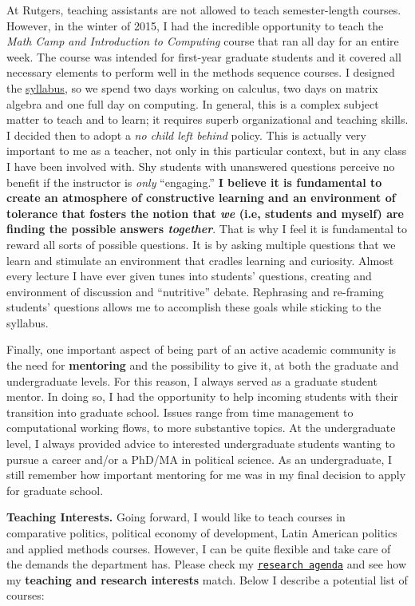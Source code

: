 \documentclass[10pt,stdletter,dateno,sigleft]{newlfm} %
\begin{document}
\begin{newlfm}
At Rutgers, teaching assistants are not allowed to teach semester-length courses. However, in the winter of 2015, I had the incredible opportunity to teach the \emph{Math Camp and Introduction to Computing} course that ran all day for an entire week. The course was intended for first-year graduate students and it covered all necessary elements to perform well in the methods sequence courses. I designed the \href{https://github.com/hbahamonde/Math-Camp/raw/master/Syllabus/Math_Camp_Syllabus.pdf}{syllabus}, so we spend two days working on calculus, two days on matrix algebra and one full day on computing. In general, this is a complex subject matter to teach and to learn; it requires superb organizational and teaching skills. I decided then to adopt a \emph{no child left behind} policy. This is actually very important to me as a teacher, not only in this particular context, but in any class I have been involved with. Shy students with unanswered questions perceive no benefit if the instructor is \emph{only} ``engaging.'' {\bf I believe it is fundamental to create an atmosphere of constructive learning and an environment of tolerance that fosters the notion that \emph{we} (i.e, students and myself) are finding the possible answers \emph{together}}. That is why I feel it is fundamental to reward all sorts of possible questions. It is by asking multiple questions that we learn and stimulate an environment that cradles learning and curiosity. Almost every lecture I have ever given tunes into students' questions, creating and environment of discussion and ``nutritive'' debate. Rephrasing and re-framing students' questions allows me to accomplish these goals while sticking to the syllabus. 

Finally, one important aspect of being part of an active academic community is the need for {\bf mentoring} and the possibility to give it, at both the graduate and undergraduate levels. For this reason, I always served as a graduate student mentor. In doing so, I had the opportunity to help incoming students with their transition into graduate school. Issues range from time management to computational working flows, to more substantive topics. At the undergraduate level, I always provided advice to interested undergraduate students wanting to pursue a career and/or a PhD/MA in political science. As an undergraduate, I still remember how important mentoring for me was in my final decision to apply for graduate school.

{\bf Teaching Interests.} Going forward, I would like to teach courses in comparative politics, political economy of development, Latin American politics and applied methods courses. However, I can be quite flexible and take care of the demands the department has. Please check my \href{http://www.hectorbahamonde.com/research/}{\texttt{research agenda}} and see how my {\bf teaching and research interests} match. Below I describe a potential list of courses:


\end{newlfm}
\end{document}
